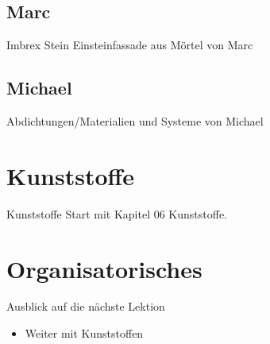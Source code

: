 \subsection{Marc}
\begin{frame}{Imbrex Stein Einsteinfassade aus Mörtel}
    von Marc

    
\end{frame}

\subsection{Michael}
\begin{frame}{Abdichtungen/Materialien und Systeme}
    von Michael
\end{frame}







\section{Kunststoffe}
\BlueSectionSlide
\begin{frame}{Kunststoffe}
Start mit Kapitel 06 Kunststoffe.
\end{frame}


\section{Organisatorisches}
\BlueSectionSlide






\begin{frame}{Ausblick auf die nächste Lektion}
\begin{itemize}
    \item Weiter mit Kunststoffen
\end{itemize}

\end{frame}


